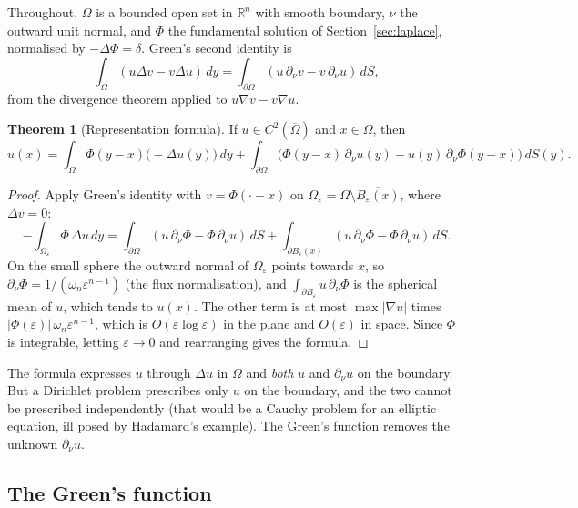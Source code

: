 \documentclass[11pt,a4paper]{article}
\numberwithin{equation}{section}
\theoremstyle{definition}
\newtheorem{thm}{Theorem}[subsection]
\begin{document}
Throughout, $\Omega$ is a bounded open set in $\mathbb R^n$ with smooth boundary, $\nu$ the outward unit normal, and $\Phi$ the fundamental solution of Section~\ref{sec:laplace}, normalised by $-\Delta\Phi = \delta$. Green's second identity is
\[
\int_\Omega(u\Delta v - v\Delta u)\,dy = \int_{\partial\Omega}(u\,\partial_\nu v - v\,\partial_\nu u)\,dS ,
\]
from the divergence theorem applied to $u\nabla v - v\nabla u$.

\begin{thm}[Representation formula]
\label{thm:representation}
If $u \in C^2(\overline\Omega)$ and $x \in \Omega$, then
\[
u(x) = \int_\Omega\Phi(y - x)\bigl(-\Delta u(y)\bigr)\,dy + \int_{\partial\Omega}\bigl(\Phi(y - x)\,\partial_\nu u(y) - u(y)\,\partial_\nu\Phi(y - x)\bigr)\,dS(y) .
\]
\end{thm}

\begin{proof}
Apply Green's identity with $v = \Phi(\cdot - x)$ on $\Omega_\varepsilon = \Omega \setminus \overline{B_\varepsilon(x)}$, where $\Delta v = 0$:
\[
-\int_{\Omega_\varepsilon}\Phi\,\Delta u\,dy = \int_{\partial\Omega}(u\,\partial_\nu\Phi - \Phi\,\partial_\nu u)\,dS + \int_{\partial B_\varepsilon(x)}(u\,\partial_\nu\Phi - \Phi\,\partial_\nu u)\,dS .
\]
On the small sphere the outward normal of $\Omega_\varepsilon$ points towards $x$, so $\partial_\nu\Phi = 1/(\omega_n\varepsilon^{n - 1})$ (the flux normalisation), and $\int_{\partial B_\varepsilon}u\,\partial_\nu\Phi$ is the spherical mean of $u$, which tends to $u(x)$. The other term is at most $\max|\nabla u|$ times
$|\Phi(\varepsilon)|\,\omega_n\varepsilon^{n - 1}$, which is $O(\varepsilon\log\varepsilon)$ in the plane and $O(\varepsilon)$ in space. Since $\Phi$ is integrable, letting $\varepsilon \to 0$ and rearranging gives the formula.
\end{proof}

The formula expresses $u$ through $\Delta u$ in $\Omega$ and \emph{both} $u$ and $\partial_\nu u$ on the boundary. But a Dirichlet problem prescribes only $u$ on the boundary, and the two cannot be prescribed independently (that would be a Cauchy problem for an elliptic equation, ill posed by Hadamard's example). The
Green's function removes the unknown $\partial_\nu u$.

\subsection{The Green's function}
\label{ssec:greenfunction}
\end{document}

